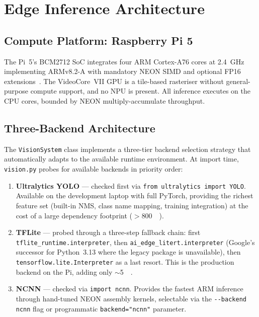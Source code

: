 \documentclass[10pt,a4paper]{article}
\begin{document}

\section{Edge Inference Architecture}\label{sec:inference}

\subsection{Compute Platform: Raspberry Pi 5}

The Pi~5's BCM2712 SoC integrates four ARM Cortex-A76 cores at \SI{2.4}{\giga\hertz} implementing ARMv8.2-A with mandatory NEON SIMD and optional FP16 extensions~\cite{raspberrypi5}. The VideoCore~VII GPU is a tile-based rasteriser without general-purpose compute support, and no NPU is present. All inference executes on the CPU cores, bounded by NEON multiply-accumulate throughput.

\subsection{Three-Backend Architecture}\label{sec:inference:dual}

The \texttt{VisionSystem} class implements a three-tier backend selection strategy that automatically adapts to the available runtime environment. At import time, \texttt{vision.py} probes for available backends in priority order:

\begin{enumerate}
    \item \textbf{Ultralytics YOLO} --- checked first via \texttt{from ultralytics import YOLO}. Available on the development laptop with full PyTorch, providing the richest feature set (built-in NMS, class name mapping, training integration) at the cost of a large dependency footprint ($>$\SI{800}{\mega\byte}).
    \item \textbf{TFLite} --- probed through a three-step fallback chain: first \texttt{tflite\_runtime.interpreter}, then \texttt{ai\_edge\_litert.interpreter} (Google's successor for Python~3.13 where the legacy package is unavailable), then \texttt{tensorflow.lite.Interpreter} as a last resort. This is the production backend on the Pi, adding only ${\sim}$\SI{5}{\mega\byte}.
    \item \textbf{NCNN} --- checked via \texttt{import ncnn}. Provides the fastest ARM inference through hand-tuned NEON assembly kernels, selectable via the \texttt{-{}-backend ncnn} flag or programmatic \texttt{backend="ncnn"} parameter.
\end{enumerate}
\end{document}
